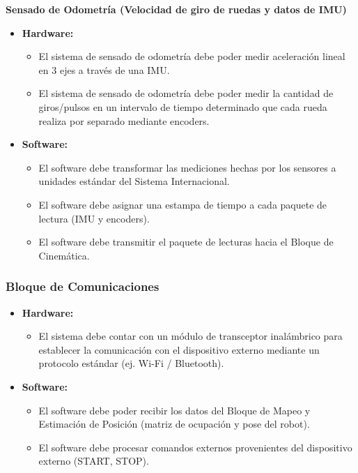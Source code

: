 \documentclass[12pt,a4paper]{article}
\begin{document}
\noindent\textbf{Sensado de Odometría (Velocidad de giro de ruedas y datos de IMU)}
\begin{itemize}
    \item \textbf{Hardware:}
    \begin{itemize}
        \item El sistema de sensado de odometría debe poder medir aceleración lineal en 3 ejes a través de una IMU.
        \item El sistema de sensado de odometría debe poder medir la cantidad de giros/pulsos en un intervalo de tiempo determinado que cada rueda realiza por separado mediante encoders.
    \end{itemize}
    \item \textbf{Software:}
    \begin{itemize}
        \item El software debe transformar las mediciones hechas por los sensores a unidades estándar del Sistema Internacional.
        \item El software debe asignar una estampa de tiempo a cada paquete de lectura (IMU y encoders).
        \item El software debe transmitir el paquete de lecturas hacia el Bloque de Cinemática.
    \end{itemize}
\end{itemize}

\subsubsection{Bloque de Comunicaciones}
\begin{itemize}
    \item \textbf{Hardware:}
    \begin{itemize}
        \item El sistema debe contar con un módulo de transceptor inalámbrico para establecer la comunicación con el dispositivo externo mediante un protocolo estándar (ej. Wi-Fi / Bluetooth).
    \end{itemize}
    \item \textbf{Software:}
    \begin{itemize}
        \item El software debe poder recibir los datos del Bloque de Mapeo y Estimación de Posición (matriz de ocupación y pose del robot).
        \item El software debe procesar comandos externos provenientes del dispositivo externo (START, STOP).
    \end{itemize}
\end{itemize}
\end{document}
